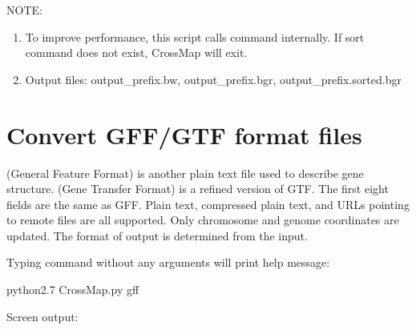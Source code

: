 \documentclass[letterpaper,10pt,english]{sphinxmanual}
\begin{document}
NOTE:
\begin{enumerate}
\item {} 
To improve performance, this script calls  command
internally. If \sphinxquotedblleft{}sort\sphinxquotedblright{} command does not exist, CrossMap will exit.

\item {} 
Output files: output\_prefix.bw, output\_prefix.bgr, output\_prefix.sorted.bgr

\end{enumerate}


\section{Convert GFF/GTF format files}
\label{\detokenize{index:convert-gff-gtf-format-files}}
 (General Feature Format) is another
plain text file used to describe gene structure. 
(Gene Transfer Format) is a refined version of GTF. The first eight fields are the same as
GFF. Plain text, compressed plain text, and URLs pointing to remote files are all supported.
Only chromosome and genome coordinates are updated. The format of output is determined from
the input.

Typing command without any arguments will print help message:

\begin{sphinxVerbatim}[commandchars=\\\{\}]
\PYGZdl{} python2.7 CrossMap.py  gff
\end{sphinxVerbatim}

Screen output:
\end{document}
